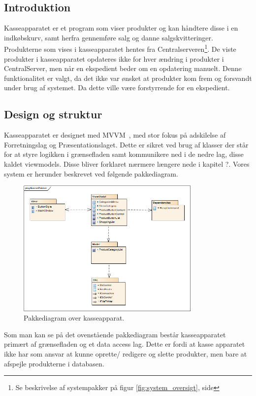 \subsection{Introduktion}
Kasseapparatet er et program som viser produkter og kan håndtere disse i en indkøbskurv, samt herfra gennemføre salg og danne salgskvitteringer. Produkterne som vises i kasseapparatet hentes fra Centralserveren\footnote{Se beskrivelse af systempakker på figur \ref{fig:system_oversigt}, side \pageref{fig:system_oversigt}}. De viste produkter i kasseapparatet opdateres ikke for hver ændring i produkter i CentralServer, men når en ekspedient beder om en opdatering manuelt. Denne funktionalitet er valgt, da det ikke var ønsket at produkter kom frem og forsvandt under brug af systemet. Da dette ville være forstyrrende for en ekspedient.


\subsection{Design og struktur}
Kasseapparatet er designet med MVVM~\cite{MVVM}, med stor fokus på adskilelse af Forretningslag og Præsentationslaget. Dette er sikret ved brug af klasser der står for at styre logikken i grænsefladen samt kommunikere ned i de nedre lag, disse kaldet viewmodels. Disse bliver forklaret nærmere længere nede i kapitel ?.
Vores system er herunder beskrevet ved følgende pakkediagram.	

\begin{figure}[H]
	\centering
	\includegraphics[width=0.8\textwidth]{Systemdesign/Frontend/pics/KassePakker}
	\caption{Pakkediagram over kasseapparat.}
	\label{fig:EndeligeGUI}
\end{figure}

Som man kan se på det ovenstående pakkediagram består kasseapparatet primært af grænsefladen og et data access lag. Dette er fordi at kasse apparatet ikke har som ansvar at kunne oprette/ redigere og slette produkter, men bare at afspejle produkterne i databasen. 

